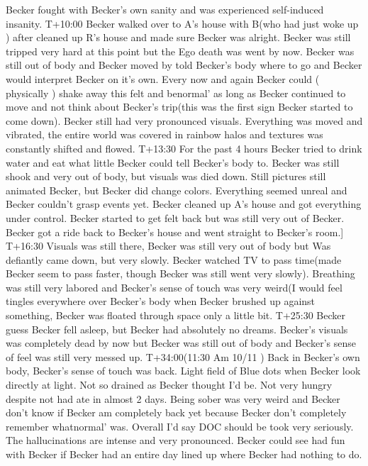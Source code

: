 \documentclass[12pt]{book}
\begin{document}
Becker fought with Becker's own sanity and was experienced self-induced insanity. T+10:00 Becker walked over to A's house with B(who had just woke up ) after cleaned up R's house and made sure Becker was alright. Becker was still tripped very hard at this point but the Ego death was went by now. Becker was still out of body and Becker moved by told Becker's body where to go and Becker would interpret Becker on it's own. Every now and again Becker could ( physically ) shake away this felt and benormal' as long as Becker continued to move and not think about Becker's trip(this was the first sign Becker started to come down). Becker still had very pronounced visuals. Everything was moved and vibrated, the entire world was covered in rainbow halos and textures was constantly shifted and flowed. T+13:30 For the past 4 hours Becker tried to drink water and eat what little Becker could tell Becker's body to. Becker was still shook and very out of body, but visuals was died down. Still pictures still animated Becker, but Becker did change colors. Everything seemed unreal and Becker couldn't grasp events yet. Becker cleaned up A's house and got everything under control. Becker started to get felt back but was still very out of Becker. Becker got a ride back to Becker's house and went straight to Becker's room.] T+16:30 Visuals was still there, Becker was still very out of body but Was defiantly came down, but very slowly. Becker watched TV to pass time(made Becker seem to pass faster, though Becker was still went very slowly). Breathing was still very labored and Becker's sense of touch was very weird(I would feel tingles everywhere over Becker's body when Becker brushed up against something, Becker was floated through space only a little bit. T+25:30 Becker guess Becker fell asleep, but Becker had absolutely no dreams. Becker's visuals was completely dead by now but Becker was still out of body and Becker's sense of feel was still very messed up. T+34:00(11:30 Am 10/11 ) Back in Becker's own body, Becker's sense of touch was back. Light field of Blue dots when Becker look directly at light. Not so drained as Becker thought I'd be. Not very hungry despite not had ate in almost 2 days. Being sober was very weird and Becker don't know if Becker am completely back yet because Becker don't completely remember whatnormal' was. Overall I'd say DOC should be took very seriously. The hallucinations are intense and very pronounced. Becker could see had fun with Becker if Becker had an entire day lined up where Becker had nothing to do.
\end{document}

